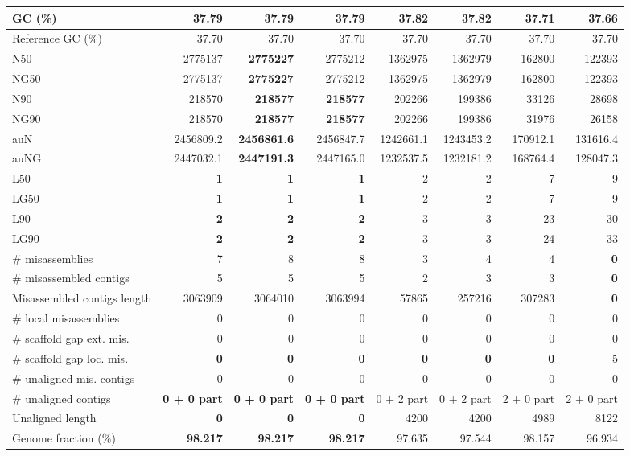\documentclass[12pt,a4paper]{article}
\begin{document}
\begin{table}[ht]
\begin{center}
\begin{tabular}{|l*{7}{|r}|}
GC (\%) & 37.79 & 37.79 & 37.79 & 37.82 & 37.82 & 37.71 & 37.66 \\ \hline
Reference GC (\%) & 37.70 & 37.70 & 37.70 & 37.70 & 37.70 & 37.70 & 37.70 \\ \hline
N50 & 2775137 & {\bf 2775227} & 2775212 & 1362975 & 1362979 & 162800 & 122393 \\ \hline
NG50 & 2775137 & {\bf 2775227} & 2775212 & 1362975 & 1362979 & 162800 & 122393 \\ \hline
N90 & 218570 & {\bf 218577} & {\bf 218577} & 202266 & 199386 & 33126 & 28698 \\ \hline
NG90 & 218570 & {\bf 218577} & {\bf 218577} & 202266 & 199386 & 31976 & 26158 \\ \hline
auN & 2456809.2 & {\bf 2456861.6} & 2456847.7 & 1242661.1 & 1243453.2 & 170912.1 & 131616.4 \\ \hline
auNG & 2447032.1 & {\bf 2447191.3} & 2447165.0 & 1232537.5 & 1232181.2 & 168764.4 & 128047.3 \\ \hline
L50 & {\bf 1} & {\bf 1} & {\bf 1} & 2 & 2 & 7 & 9 \\ \hline
LG50 & {\bf 1} & {\bf 1} & {\bf 1} & 2 & 2 & 7 & 9 \\ \hline
L90 & {\bf 2} & {\bf 2} & {\bf 2} & 3 & 3 & 23 & 30 \\ \hline
LG90 & {\bf 2} & {\bf 2} & {\bf 2} & 3 & 3 & 24 & 33 \\ \hline
\# misassemblies & 7 & 8 & 8 & 3 & 4 & 4 & {\bf 0} \\ \hline
\# misassembled contigs & 5 & 5 & 5 & 2 & 3 & 3 & {\bf 0} \\ \hline
Misassembled contigs length & 3063909 & 3064010 & 3063994 & 57865 & 257216 & 307283 & {\bf 0} \\ \hline
\# local misassemblies & 0 & 0 & 0 & 0 & 0 & 0 & 0 \\ \hline
\# scaffold gap ext. mis. & 0 & 0 & 0 & 0 & 0 & 0 & 0 \\ \hline
\# scaffold gap loc. mis. & {\bf 0} & {\bf 0} & {\bf 0} & {\bf 0} & {\bf 0} & {\bf 0} & 5 \\ \hline
\# unaligned mis. contigs & 0 & 0 & 0 & 0 & 0 & 0 & 0 \\ \hline
\# unaligned contigs & {\bf 0 + 0 part} & {\bf 0 + 0 part} & {\bf 0 + 0 part} & 0 + 2 part & 0 + 2 part & 2 + 0 part & 2 + 0 part \\ \hline
Unaligned length & {\bf 0} & {\bf 0} & {\bf 0} & 4200 & 4200 & 4989 & 8122 \\ \hline
Genome fraction (\%) & {\bf 98.217} & {\bf 98.217} & {\bf 98.217} & 97.635 & 97.544 & 98.157 & 96.934 \\ \hline

\end{tabular}
\end{center}
\end{table}
\end{document}
